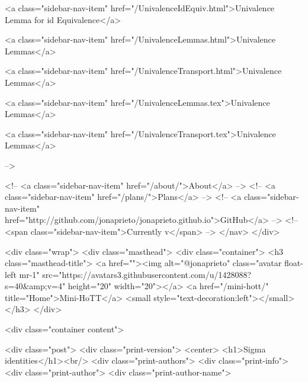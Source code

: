       
    
      
        
          <a class="sidebar-nav-item" href="/UnivalenceIdEquiv.html">Univalence Lemma for id Equivalence</a>
        
      
    
      
        
          <a class="sidebar-nav-item" href="/UnivalenceLemmas.html">Univalence Lemmas</a>
        
      
    
      
        
          <a class="sidebar-nav-item" href="/UnivalenceTransport.html">Univalence Lemmas</a>
        
      
    
      
        
          <a class="sidebar-nav-item" href="/UnivalenceLemmas.tex">Univalence Lemmas</a>
        
      
    
      
        
          <a class="sidebar-nav-item" href="/UnivalenceTransport.tex">Univalence Lemmas</a>
        
      
     -->

    <!-- <a class="sidebar-nav-item" href="/about/">About</a> -->
    <!-- <a class="sidebar-nav-item" href="/plans/">Plans</a> -->
    <!-- <a class="sidebar-nav-item" href="http://github.com/jonaprieto/jonaprieto.github.io">GitHub</a> -->
    <!-- <span class="sidebar-nav-item">Currently v</span> -->
  </nav>
</div>

    <div class="wrap">
      <div class="masthead">
        <div class="container">
          <h3 class="masthead-title">
            <a href=""><img alt="@jonaprieto" class="avatar float-left mr-1" src="https://avatars3.githubusercontent.com/u/1428088?s=40&amp;v=4" height="20" width="20"></a>
            <a href="/mini-hott/" title="Home">Mini-HoTT</a>
            <small style="text-decoration:left"></small>
          </h3>
        </div>
      
      <div class="container content">
        







<div class="post">
  <div class="print-version">
    <center>
      <h1>Sigma identities</h1><br/>
        <div class="print-authors">
          <div class="print-info">
            <div class="print-author">
              <div class="print-author-name">
                
